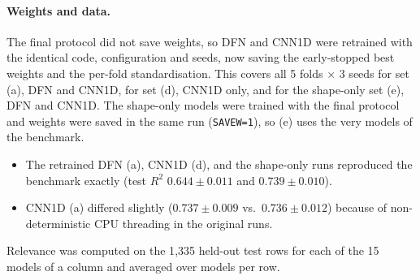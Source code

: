 \paragraph{Weights and data.} The final protocol did not save weights, so DFN and CNN1D were retrained with the identical code, configuration and seeds, now saving the early-stopped best weights and the per-fold standardisation. This covers all 5 folds $\times$ 3 seeds for set (a), DFN and CNN1D, for set (d), CNN1D only, and for the shape-only set (e), DFN and CNN1D. The shape-only models were trained with the final protocol and weights were saved in the same run (\texttt{SAVEW=1}), so (e) uses the very models of the benchmark.
\begin{itemize}
\item The retrained DFN (a), CNN1D (d), and the shape-only runs reproduced the benchmark exactly (test $R^2$ $0.644\pm0.011$ and $0.739\pm0.010$).
\item CNN1D (a) differed slightly ($0.737\pm0.009$ vs.\ $0.736\pm0.012$) because of non-deterministic CPU threading in the original runs.
\end{itemize}
Relevance was computed on the 1{,}335 held-out test rows for each of the 15 models of a column and averaged over models per row.

